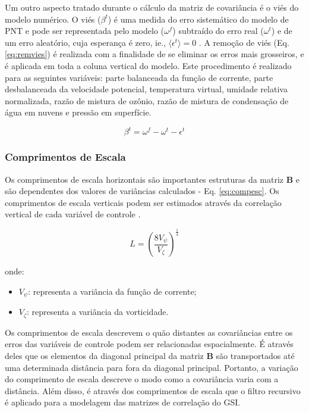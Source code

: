 Um outro aspecto tratado durante o cálculo da matriz de covariância é o viés do modelo numérico. O viés ($\beta^{t}$) é uma medida do erro sistemático do modelo de PNT e pode ser representada pelo modelo ($\omega^{f}$) subtraído do erro real ($\omega^{t}$) e de um erro aleatório, cuja esperança é zero, ie., $\langle\epsilon^{t}\rangle=0$ \cite{chepurinetal/2005}. A remoção de viés (Eq. \ref{eq:remvies}) é realizada com a finalidade de se eliminar os erros mais grosseiros, e é aplicada em toda a coluna vertical do modelo. Este procedimento é realizado para as seguintes variáveis: parte balanceada da função de corrente, parte desbalanceada da velocidade potencial, temperatura virtual, umidade relativa normalizada, razão de mistura de ozônio, razão de mistura de condensação de água em nuvens e pressão em superfície.

\begin{equation}
    \label{eq:remvies}
    \beta^{t} = \omega^{f} - \omega^{t} - \epsilon^{t}
\end{equation}

\subsubsection*{Comprimentos de Escala}

Os comprimentos de escala horizontais são importantes estruturas da matriz $\mathbf{B}$ e são dependentes dos valores de variâncias calculados - Eq. \ref{eq:compesc}. Os comprimentos de escala verticais podem ser estimados através da correlação vertical de cada variável de controle \cite{wuetal/2002}.

\begin{equation}
    \label{eq:compesc}
    L = \left( \frac{8V_{\psi}}{V_{\zeta}} \right)^{\frac{1}{4}}
\end{equation}

onde:

\begin{itemize}
    \item $V_{\psi}$: representa a variância da função de corrente;
    \item $V_{\zeta}$: representa a variância da vorticidade.
\end{itemize}

Os comprimentos de escala descrevem o quão distantes as covariâncias entre os erros das variáveis de controle podem ser relacionadas espacialmente. É através deles que os elementos da diagonal principal da matriz $\mathbf{B}$ são transportados até uma determinada distância para fora da diagonal principal. Portanto, a variação do comprimento de escala descreve o modo como a covariância varia com a distância. Além disso, é através dos comprimentos de escala que o filtro recursivo é aplicado para a modelagem das matrizes de correlação do GSI. 


